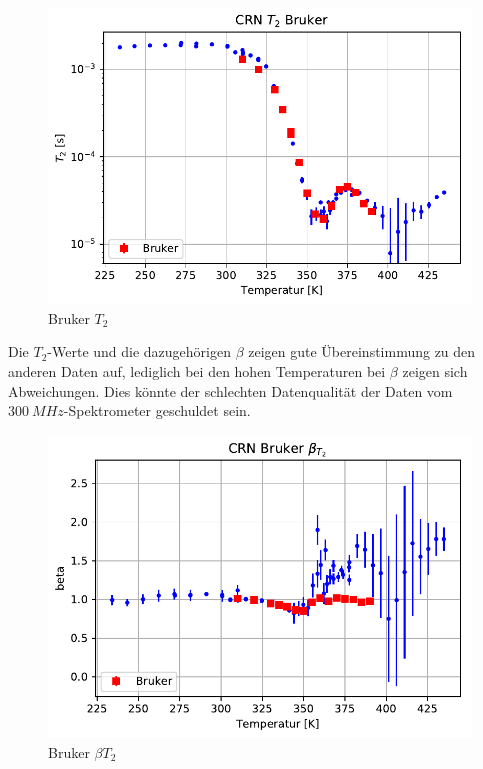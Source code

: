 \begin{figure}
	\begin{center}
		\includegraphics[width=\textwidth]{graphics/plots/BRUKER/bruker_t2.pdf}
	\end{center}
	\caption{Bruker $T_2$} \label{fig:res:bruker_t2}
\end{figure}
Die $T_2$-Werte und die dazugehörigen $\beta$ zeigen gute Übereinstimmung zu den anderen Daten auf, lediglich bei den hohen Temperaturen bei $\beta$ zeigen sich Abweichungen. Dies könnte der schlechten Datenqualität der Daten vom $\SI{300}{MHz}$-Spektrometer geschuldet sein.
\begin{figure}
	\begin{center}
		\includegraphics[width=\textwidth]{graphics/plots/BRUKER/bruker_t2beta.pdf}
	\end{center}
	\caption{Bruker $\beta{T_2}$} \label{fig:res:bruker_beta_t2}
\end{figure}

